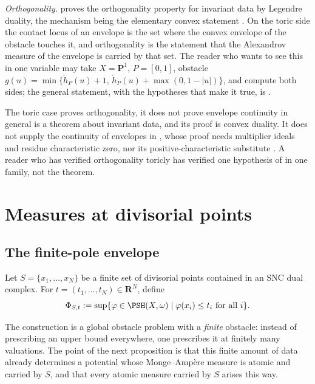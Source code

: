 \emph{Orthogonality.}   proves the
orthogonality property  for invariant
data by Legendre duality, the mechanism being the elementary convex
statement .  On the toric side the
contact locus of an envelope is the set where the convex envelope of the
obstacle touches it, and orthogonality is the statement that the Alexandrov
measure of the envelope is carried by that set.  The reader who wants to see
this in one variable may take $X=\mathbf P^1$, $P=[0,1]$, obstacle
$g(u)=\min\{\check h_P(u)+1,\,\check h_P(u)+\max(0,1-|u|)\}$, and compute
both sides; the general statement, with the hypotheses that make it true, is
.

\begin{warning}{The toric case proves orthogonality, it does not prove
envelope continuity in general}
 is a theorem about invariant data, and
its proof is convex duality.  It does not supply the continuity of envelopes
in , whose proof needs multiplier ideals
and residue characteristic zero, nor its positive-characteristic substitute
.  A reader who has verified
orthogonality toricly has verified one hypothesis of
 in one family, not the theorem.
\end{warning}

\section{Measures at divisorial points}
\label{sec:ch31-divisorial}

\subsection{The finite-pole envelope}
\label{sec:ch31-finite-pole}

Let $S=\{x_1,\ldots,x_N\}$ be a finite set of divisorial points contained
in an SNC dual complex.  For $t=(t_1,\ldots,t_N)\in\mathbf R^N$, define
\begin{equation}
 \Phi_{S,t}:=\sup\{\varphi\in\PSH(X,\omega)\mid
                         \varphi(x_i)\leq t_i\text{ for all }i\}.
\label{eq:finite-pole-envelope}
\end{equation}

The construction is a global obstacle problem with a \emph{finite} obstacle:
instead of prescribing an upper bound everywhere, one prescribes it at
finitely many valuations.  The point of the next proposition is that this
finite amount of data already determines a potential whose Monge--Amp\`ere
measure is atomic and carried by $S$, and that every atomic measure
carried by $S$ arises this way.

